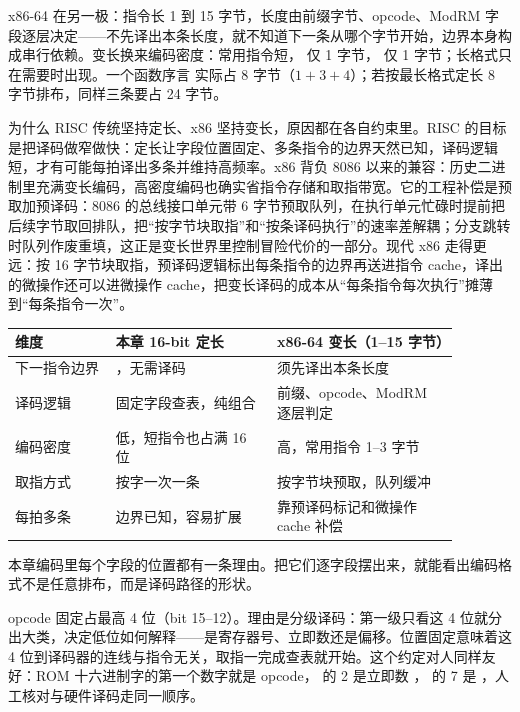 x86-64 在另一极：指令长 1 到 15 字节，长度由前缀字节、opcode、ModRM 字段逐层决定——不先译出本条长度，就不知道下一条从哪个字节开始，边界本身构成串行依赖。变长换来编码密度：常用指令短， 仅 1 字节， 仅 1 字节；长格式只在需要时出现。一个函数序言  实际占 8 字节（$1+3+4$）；若按最长格式定长 8 字节排布，同样三条要占 24 字节。

为什么 RISC 传统坚持定长、x86 坚持变长，原因都在各自约束里。RISC 的目标是把译码做窄做快：定长让字段位置固定、多条指令的边界天然已知，译码逻辑短，才有可能每拍译出多条并维持高频率。x86 背负 8086 以来的兼容：历史二进制里充满变长编码，高密度编码也确实省指令存储和取指带宽。它的工程补偿是预取加预译码：8086 的总线接口单元带 6 字节预取队列，在执行单元忙碌时提前把后续字节取回排队，把“按字节块取指”和“按条译码执行”的速率差解耦；分支跳转时队列作废重填，这正是变长世界里控制冒险代价的一部分。现代 x86 走得更远：按 16 字节块取指，预译码逻辑标出每条指令的边界再送进指令 cache，译出的微操作还可以进微操作 cache，把变长译码的成本从“每条指令每次执行”摊薄到“每条指令一次”。

\begin{longtable}{L{0.2\linewidth}L{0.32\linewidth}L{0.36\linewidth}}
\toprule
维度 & 本章 16-bit 定长 & x86-64 变长（1–15 字节） \\
\midrule
下一指令边界 & ，无需译码 & 须先译出本条长度 \\\tablerowrule
译码逻辑 & 固定字段查表，纯组合 & 前缀、opcode、ModRM 逐层判定 \\\tablerowrule
编码密度 & 低，短指令也占满 16 位 & 高，常用指令 1–3 字节 \\\tablerowrule
取指方式 & 按字一次一条 & 按字节块预取，队列缓冲 \\\tablerowrule
每拍多条 & 边界已知，容易扩展 & 靠预译码标记和微操作 cache 补偿 \\
\bottomrule
\end{longtable}

本章编码里每个字段的位置都有一条理由。把它们逐字段摆出来，就能看出编码格式不是任意排布，而是译码路径的形状。

opcode 固定占最高 4 位（bit 15–12）。理由是分级译码：第一级只看这 4 位就分出大类，决定低位如何解释——是寄存器号、立即数还是偏移。位置固定意味着这 4 位到译码器的连线与指令无关，取指一完成查表就开始。这个约定对人同样友好：ROM 十六进制字的第一个数字就是 opcode， 的 2 是立即数 ， 的 7 是 ，人工核对与硬件译码走同一顺序。

